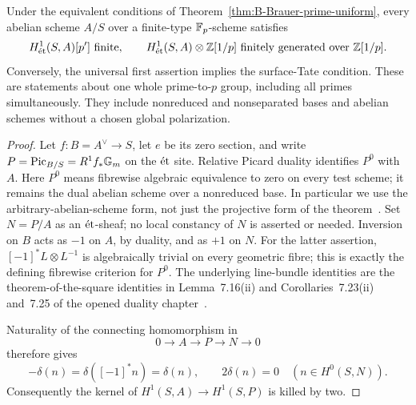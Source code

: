 \begin{corollary}
\label{cor:B-torsors-prime-uniform}
Under the equivalent conditions of
Theorem~\ref{thm:B-Brauer-prime-uniform}, every abelian scheme
\(A/S\) over a finite-type \(\mathbb F_p\)-scheme satisfies
\[
 H^1_{\et}(S,A)[p']\ \text{finite},
 \qquad
 H^1_{\et}(S,A)\otimes\Z[1/p]
       \ \text{finitely generated over }\Z[1/p].
\]
Conversely, the universal first assertion implies the surface-Tate
condition.  These are statements about one whole prime-to-\(p\)
group, including all primes simultaneously.  They include
nonreduced and nonseparated bases and abelian schemes without
a chosen global polarization.
\end{corollary}
\begin{proof}
Let \(f:B=A^\vee\to S\), let \(e\) be its zero section,
and write \(P=\operatorname{Pic}_{B/S}=R^1f_*{\mathbb G_m}\) on the
\(\mathrm{\acute et}\) site.  Relative Picard duality identifies
\(P^0\) with \(A\).  Here \(P^0\) means fibrewise algebraic
equivalence to zero on every test scheme; it remains the dual
abelian scheme over a nonreduced base.  In particular we use the
arbitrary-abelian-scheme form, not just the projective form of
the theorem~\cite[section~2.3.2, Remark~2.3.6 and Theorem~2.3.7]
{BRobert2023AbelianSchemes}.
Set \(N=P/A\) as an \(\mathrm{\acute et}\)-sheaf; no local constancy of
\(N\) is asserted or needed.  Inversion on \(B\) acts as
\(-1\) on \(A\), by duality, and as \(+1\) on \(N\).
For the latter assertion, \([-1]^*L\otimes L^{-1}\) is
algebraically trivial on every geometric fibre; this is exactly
the defining fibrewise criterion for \(P^0\).  The underlying
line-bundle identities are the theorem-of-the-square identities
in Lemma~7.16(ii) and Corollaries~7.23(ii) and~7.25 of the
opened duality chapter~\cite{BMoonenDuality2011}.

Naturality of the connecting homomorphism in
\[
 0\longrightarrow A\longrightarrow P\longrightarrow N
       \longrightarrow0
\]
therefore gives
\[
 -\delta(n)=\delta([-1]^*n)=\delta(n),
 \qquad 2\delta(n)=0\quad(n\in H^0(S,N)).
\]
Consequently the kernel of \(H^1(S,A)\to H^1(S,P)\)
is killed by two.


\end{proof}
